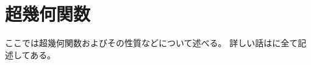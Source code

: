 \section{超幾何関数}
  \renewcommand{\theequation}{B.\arabic{equation} }
  \setcounter{equation}{0}

  ここでは超幾何関数およびその性質などについて述べる。
  詳しい話は\cite{kimura}に全て記述してある。

\pagebreak
